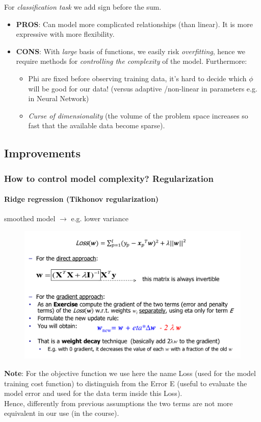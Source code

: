 \documentclass[../main.tex]{subfiles}
\begin{document}
For \emph{classification task} we add sign before the sum.
\begin{itemize}
    \item \textbf{PROS}: Can model more complicated relationships (than linear). It is more expressive with more flexibility.
    \item \textbf{CONS}: With \emph{large} basis of functions, we easily risk \emph{overfitting}, hence we require methods for \emph{controlling the complexity} of the model. Furthermore:
    \begin{itemize}
        \item Phi are fixed before observing training data, it's hard to decide which $\phi$ will be good for our data! (versus adaptive /non-linear in parameters e.g. in Neural Network)
        \item \textit{Curse of dimensionality} (the volume of the problem space increases so fast that the available data become sparse).
    \end{itemize}
\end{itemize}

\subsection{Improvements}
\subsubsection{How to control model complexity? Regularization}
\paragraph{Ridge regression (Tikhonov regularization)}
smoothed model $\rightarrow$ e.g. lower variance
\begin{figure}[H]
    \centering
    \includegraphics[scale = 0.5]{lectures/2_linear_model/tikhonov.png}
\end{figure}
\textbf{Note}: For the objective function we use here the name Loss (used for the model training cost function) to distinguish from the Error E (useful to evaluate the model error and used for the data term inside this Loss).\\
Hence, differently from previous assumptions the two terms are not more equivalent in our use (in the course).
\end{document}
